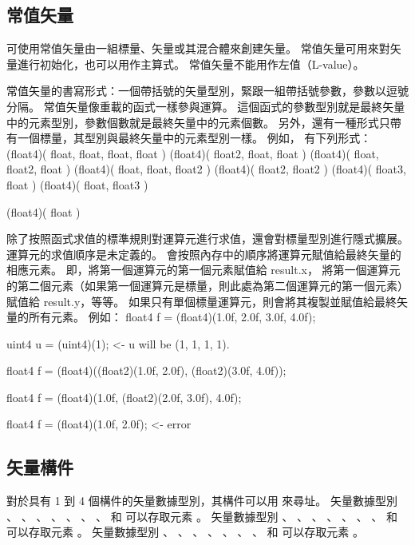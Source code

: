 \subsection{常值矢量}

可使用常值矢量由一組標量、矢量或其混合體來創建矢量。
常值矢量可用來對矢量進行初始化，也可以用作主算式。
常值矢量不能用作左值（L-value）。

常值矢量的書寫形式：一個帶括號的矢量型別，緊跟一組帶括號參數，參數以逗號分隔。
常值矢量像重載的函式一樣參與運算。
這個函式的參數型別就是最終矢量中的元素型別，參數個數就是最終矢量中的元素個數。
另外，還有一種形式只帶有一個標量，其型別與最終矢量中的元素型別一樣。
例如，  有下列形式：
\startclc
(float4)( float, float, float, float )
(float4)( float2, float, float )
(float4)( float, float2, float )
(float4)( float, float, float2 )
(float4)( float2, float2 )
(float4)( float3, float )
(float4)( float, float3 )

(float4)( float )
\stopclc

除了按照函式求值的標準規則對運算元進行求值，還會對標量型別進行隱式擴展。
運算元的求值順序是未定義的。
會按照內存中的順序將運算元賦值給最終矢量的相應元素。
即，將第一個運算元的第一個元素賦值給 result.x，
將第一個運算元的第二個元素（如果第一個運算元是標量，則此處為第二個運算元的第一個元素）
賦值給 result.y，等等。
如果只有單個標量運算元，則會將其複製並賦值給最終矢量的所有元素。
例如：
\startclc
float4	f = (float4)(1.0f, 2.0f, 3.0f, 4.0f);

uint4	u = (uint4)(1);		<- u will be (1, 1, 1, 1).

float4	f = (float4)((float2)(1.0f, 2.0f),
		     (float2)(3.0f, 4.0f));

float4	f = (float4)(1.0f, (float2)(2.0f, 3.0f), 4.0f);

float4	f = (float4)(1.0f, 2.0f);	<- error
\stopclc

\subsection{矢量構件}

對於具有 1 到 4 個構件的矢量數據型別，其構件可以用  來尋址。
矢量數據型別 、 、 、 、
 、 、 、  和 
 可以存取元素 。
矢量數據型別 、 、 、 、
 、 、 、  和 
 可以存取元素 。
矢量數據型別 、 、 、 、
 、 、 、  和 
 可以存取元素 。

